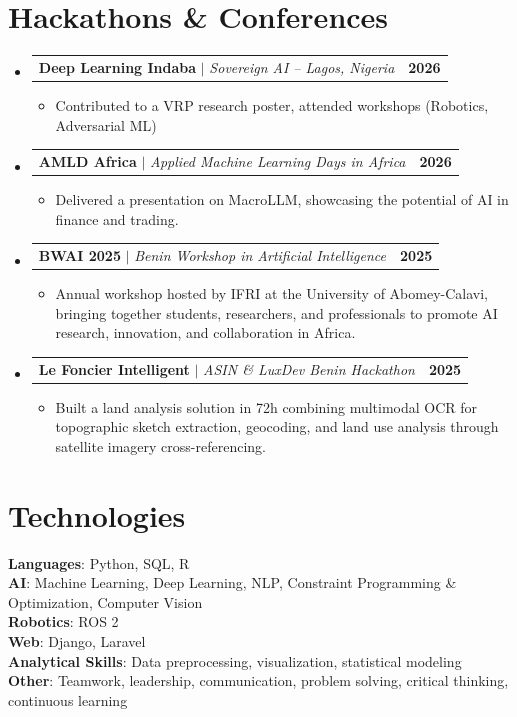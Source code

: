 \documentclass[letterpaper,12pt]{article}
\makeatletter
\newcommand{\resumeItem}[1]{
  \item\small{
    {#1 \vspace{-2pt}}
  }
}
\newcommand{\resumeProjectHeading}[2]{
    \item
    \begin{tabular*}{1.001\textwidth}{l@{\extracolsep{\fill}}r}
      \small#1 & \textbf{\small #2}\\
    \end{tabular*}\vspace{-7pt}
}
\newcommand{\resumeSubHeadingListStart}{\begin{itemize}[leftmargin=0.0in, label={}]}
\newcommand{\resumeSubHeadingListEnd}{\end{itemize}}
\newcommand{\resumeItemListStart}{\begin{itemize}}
\newcommand{\resumeItemListEnd}{\end{itemize}\vspace{-5pt}}
\makeatother
\begin{document}
\section{Hackathons \& Conferences}
    \resumeSubHeadingListStart

      \resumeProjectHeading
          {\textbf{Deep Learning Indaba} $|$ \emph{Sovereign AI -- Lagos, Nigeria}}{2026}
          \resumeItemListStart
            \resumeItem{Contributed to a VRP research poster, attended workshops (Robotics, Adversarial ML)}
          \resumeItemListEnd
          \vspace{-10pt}

      \resumeProjectHeading
          {\textbf{AMLD Africa} $|$ \emph{Applied Machine Learning Days in Africa}}{2026}
          \resumeItemListStart
            \resumeItem{Delivered a presentation on MacroLLM, showcasing the potential of AI in finance and trading.}
          \resumeItemListEnd
          \vspace{-10pt}

      \resumeProjectHeading
          {\textbf{BWAI 2025} $|$ \emph{Benin Workshop in Artificial Intelligence}}{2025}
          \resumeItemListStart
            \resumeItem{Annual workshop hosted by IFRI at the University of Abomey-Calavi, bringing together students, researchers, and professionals to promote AI research, innovation, and collaboration in Africa.}
          \resumeItemListEnd
          \vspace{-10pt}

      \resumeProjectHeading
          {\textbf{Le Foncier Intelligent} $|$ \emph{ASIN \& LuxDev Benin Hackathon}}{2025}
          \resumeItemListStart
            \resumeItem{Built a land analysis solution in 72h combining multimodal OCR for topographic sketch extraction, geocoding, and land use analysis through satellite imagery cross-referencing.}
          \resumeItemListEnd

    \resumeSubHeadingListEnd
  \vspace{-10pt}

\section{Technologies}
 \begin{itemize}[leftmargin=0.15in, label={}]
    \small{\item{
     \textbf{Languages}{: Python, SQL, R} \\
     \textbf{AI}{: Machine Learning, Deep Learning, NLP, Constraint Programming \& Optimization, Computer Vision} \\
     \textbf{Robotics}{: ROS 2} \\
     \textbf{Web}{: Django, Laravel} \\
     \textbf{Analytical Skills}{: Data preprocessing, visualization, statistical modeling} \\
     \textbf{Other}{: Teamwork, leadership, communication, problem solving, critical thinking, continuous learning}
    }}
 \end{itemize}
 \vspace{-10pt}
\end{document}
